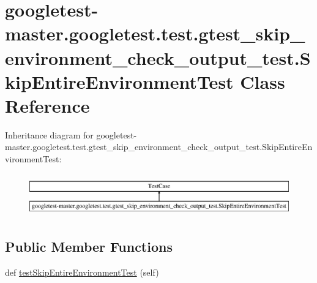 \hypertarget{classgoogletest-master_1_1googletest_1_1test_1_1gtest__skip__environment__check__output__test_1_1_skip_entire_environment_test}{}\section{googletest-\/master.googletest.\+test.\+gtest\+\_\+skip\+\_\+environment\+\_\+check\+\_\+output\+\_\+test.\+Skip\+Entire\+Environment\+Test Class Reference}
\label{classgoogletest-master_1_1googletest_1_1test_1_1gtest__skip__environment__check__output__test_1_1_skip_entire_environment_test}
Inheritance diagram for googletest-\/master.googletest.\+test.\+gtest\+\_\+skip\+\_\+environment\+\_\+check\+\_\+output\+\_\+test.\+Skip\+Entire\+Environment\+Test\+:\begin{figure}[H]
\begin{center}
\leavevmode
\includegraphics[height=1.860465cm]{dc/da0/classgoogletest-master_1_1googletest_1_1test_1_1gtest__skip__environment__check__output__test_1_1_skip_entire_environment_test}
\end{center}
\end{figure}
\subsection*{Public Member Functions}
\begin{DoxyCompactItemize}
\item 
def \mbox{\hyperlink{classgoogletest-master_1_1googletest_1_1test_1_1gtest__skip__environment__check__output__test_1_1_skip_entire_environment_test_a12d222e6b5ea815368a420b20914d503}{test\+Skip\+Entire\+Environment\+Test}} (self)
\end{DoxyCompactItemize}


